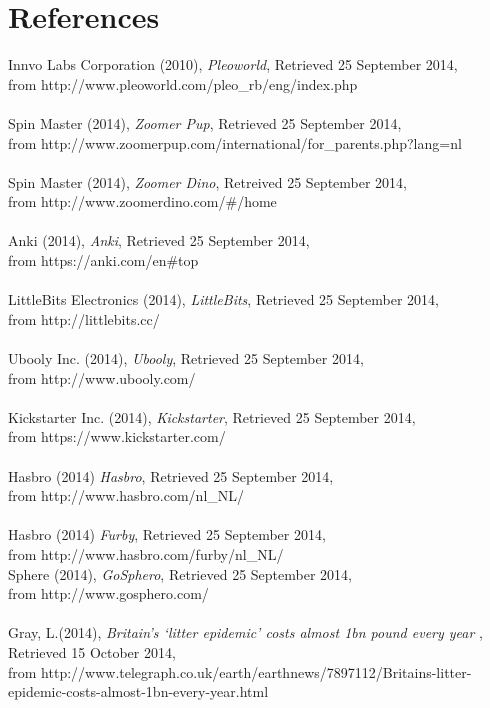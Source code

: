 \documentclass[11pt,twoside,a4paper]{report}
\begin{document}
\chapter{References}
Innvo Labs Corporation (2010), \textit{Pleoworld}, Retrieved 25 September 2014, \\from http://www.pleoworld.com/pleo\_rb/eng/index.php \\
\\
Spin Master (2014), \textit{Zoomer Pup}, Retrieved 25 September 2014, \\from http://www.zoomerpup.com/international/for\_parents.php?lang=nl\\
\\
Spin Master (2014), \textit{Zoomer Dino}, Retreived 25 September 2014, \\from http://www.zoomerdino.com/\#/home\\
\\
Anki (2014), \textit{Anki}, Retrieved 25 September 2014, \\from https://anki.com/en\#top \\
\\
LittleBits Electronics (2014), \textit{LittleBits}, Retrieved 25 September 2014,\\ from http://littlebits.cc/ \\
\\
Ubooly Inc. (2014), \textit{Ubooly}, Retrieved 25 September 2014,\\ from http://www.ubooly.com/ \\
\\
Kickstarter Inc. (2014), \textit{Kickstarter}, Retrieved 25 September 2014, \\from https://www.kickstarter.com/ \\
\\
Hasbro (2014) \textit{Hasbro}, Retrieved 25 September 2014, \\from http://www.hasbro.com/nl\_NL/ \\
\\
Hasbro (2014) \textit{Furby}, Retrieved 25 September 2014, \\from http://www.hasbro.com/furby/nl\_NL/ \\
Sphere (2014), \textit{GoSphero}, Retrieved 25 September 2014,\\ from http://www.gosphero.com/ \\
\\
Gray, L.(2014), \textit{Britain\rq{}s \lq{}litter epidemic\rq{} costs almost 1bn pound every year} , Retrieved 15 October 2014, \\from http://www.telegraph.co.uk/earth/earthnews/7897112/Britains-litter-epidemic-costs-almost-1bn-every-year.html \\
\end{document}
